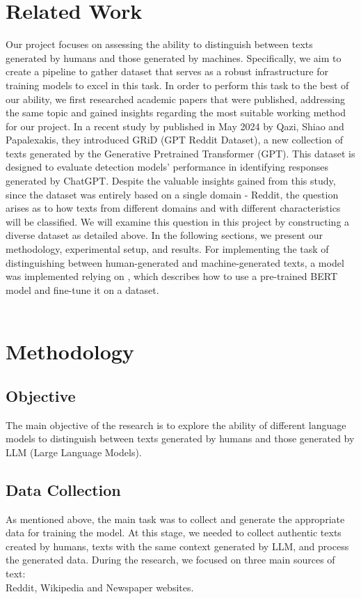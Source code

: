 \documentclass[11pt]{article}
\begin{document}
\section{Related Work}
Our project focuses on assessing the ability to distinguish between texts generated by humans and those generated by machines. Specifically, we aim to create a pipeline to gather dataset that serves as a robust infrastructure for training models to excel in this task.   
In order to perform this task to the best of our ability, we first researched academic papers that were published, addressing the same topic and gained insights regarding the most suitable working method for our project.
In a recent study by \citet{GRiD} published in May 2024 by Qazi, Shiao and Papalexakis, they introduced GRiD (GPT Reddit Dataset), a new collection of texts generated by the Generative Pretrained Transformer (GPT). This dataset is designed to evaluate detection models' performance in identifying responses generated by ChatGPT.
Despite the valuable insights gained from this study, since the dataset was entirely based on a single domain - Reddit, the question arises as to how texts from different domains and with different characteristics will be classified. We will examine this question in this project by constructing a diverse dataset as detailed above. In the following sections, we present our methodology, experimental setup, and results.
For implementing the task of distinguishing between human-generated and machine-generated texts, a model was implemented relying on \citet{BERT}, which describes how to use a pre-trained BERT model and fine-tune it on a dataset. \\ \\

\section{Methodology}
\subsection{Objective}
The main objective of the research is to explore the ability of different language models to distinguish between texts generated by humans and those generated by LLM (Large Language Models).
\subsection{Data Collection}
As mentioned above, the main task was to collect and generate the appropriate data for training the model. At this stage, we needed to collect authentic texts created by humans, texts with the same context generated by LLM, and process the generated data.
During the research, we focused on three main sources of text:\\ Reddit, Wikipedia and Newspaper websites.
\end{document}
